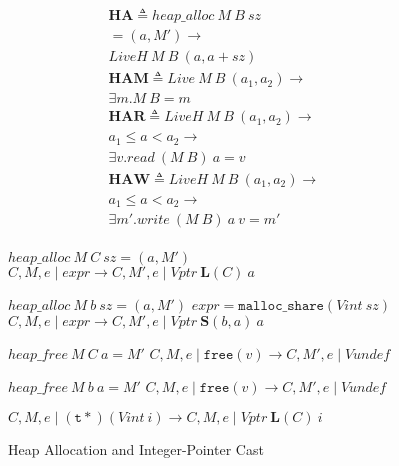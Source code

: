 \documentclass{article}
\begin{document}
\begin{figure}
  \begin{minipage}[t]{0.3\textwidth}
    \[\begin{aligned}
    \mathbf{HA} \triangleq
    \mathit{heap\_alloc} ~ M ~ B ~ sz & \\ = (a, M') \rightarrow & \\
    \mathit{LiveH} ~ M ~ B ~ (a, a+sz) \\[0.75em]
    \mathbf{HAM} \triangleq
    \mathit{Live} ~ M ~ B ~ (a_1,a_2) \rightarrow & \\
    \exists m . M ~ B = m & \\[0.75em]
    \mathbf{HAR} \triangleq
    \mathit{LiveH} ~ M ~ B ~ (a_1,a_2) \rightarrow & \\
    a_1 \leq a < a_2 \rightarrow & \\
    \exists v . \mathit{read} ~ (M ~ B) ~ a = v & \\[0.75em]
    \mathbf{HAW} \triangleq
    \mathit{LiveH} ~ M ~ B ~ (a_1,a_2) \rightarrow & \\
    a_1 \leq a < a_2 \rightarrow & \\    
    \exists m' . \mathit{write} ~ (M ~ B) ~ a ~ v = m' & \\
    \end{aligned}\]
  \end{minipage}
  \begin{minipage}[t]{0.69\textwidth}
             {\(\mathit{heap\_alloc} ~ M ~ C ~ sz = (a, M')\)}
             {\(C,M,e\mid \mathit{expr} \longrightarrow
               C,M',e \mid \mathit{Vptr} ~ \mathbf{L}(C) ~ a\)}

                    {\(\mathit{heap\_alloc} ~ M ~ b ~ sz = (a, M')\)}
                    {\(\mathit{expr} = \mathtt{malloc\_share}(\mathit{Vint} ~ sz)\)}
                    {\(C,M,e \mid \mathit{expr} \longrightarrow
                      C,M',e \mid \mathit{Vptr} ~ \mathbf{S}(b,a) ~ a\)}

              {\(\mathit{heap\_free} ~ M ~ C ~ a = M'\)}
              {\(C,M,e \mid \mathtt{free}(v) \longrightarrow
                C,M',e \mid \mathit{Vundef}\)}
              
             {\(\mathit{heap\_free} ~ M ~ b ~ a = M'\)}
             {\(C,M,e \mid \mathtt{free}(v)  \longrightarrow
               C,M',e \mid \mathit{Vundef}\)}
           
  \judgment[CastIP]
           {}
           {\(C,M,e \mid \mathtt{(t*)} (\mathit{Vint} ~ i) \longrightarrow
             C,M,e \mid \mathit{Vptr} ~ \mathbf{L}(C) ~ \mathit{i}\)}
  \end{minipage}

  \caption{Heap Allocation and Integer-Pointer Cast}
  \label{subfig:alstep}
\end{figure}
\end{document}
